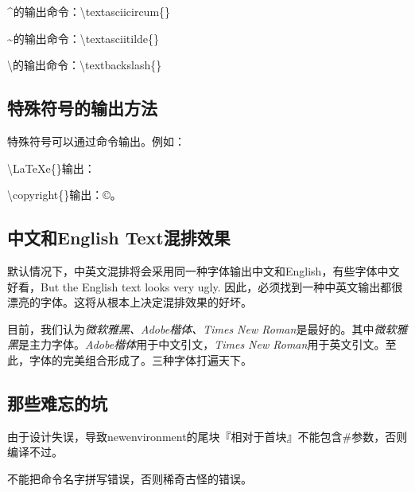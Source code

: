 \textasciicircum{}的输出命令：\textbackslash{}textasciicircum\{\}

\textasciitilde{}的输出命令：\textbackslash{}textasciitilde\{\}

\textbackslash{}的输出命令：\textbackslash{}textbackslash\{\}

\subsection{特殊符号的输出方法}

特殊符号可以通过命令输出。例如：

\textbackslash{}LaTeXe\{\}输出：\LaTeXe{}

\textbackslash{}copyright\{\}输出：\copyright{}。

\subsection{中文和English Text混排效果}
\label{subsec:chinese_mix_english}

默认情况下，中英文混排将会采用同一种字体输出中文和English，有些字体中文好看，But the English text looks very ugly. 因此，必须找到一种中英文输出都很漂亮的字体。这将从根本上决定混排效果的好坏。

目前，我们认为\emph{微软雅黑、Adobe楷体、Times New Roman}是最好的。其中\emph{微软雅黑}是主力字体。\emph{Adobe楷体}用于中文引文，\emph{Times New Roman}用于英文引文。至此，字体的完美组合形成了。三种字体打遍天下。

\subsection{那些难忘的坑}

由于设计失误，导致newenvironment的尾块『相对于首块』不能包含\#参数，否则编译不过。

不能把命令名字拼写错误，否则稀奇古怪的错误。